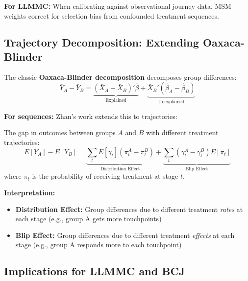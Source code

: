 \textbf{For LLMMC:} When calibrating against observational journey data, MSM weights
correct for selection bias from confounded treatment sequences.

\subsection{Trajectory Decomposition: Extending Oaxaca-Blinder}

The classic \textbf{Oaxaca-Blinder decomposition} \citep{PAP-oaxaca1973decomposition}
decomposes group differences:
\[
\bar{Y}_A - \bar{Y}_B = \underbrace{(\bar{X}_A - \bar{X}_B)'\hat{\beta}}_{\text{Explained}} + \underbrace{\bar{X}_B'(\hat{\beta}_A - \hat{\beta}_B)}_{\text{Unexplained}}
\]

\textbf{For sequences:} Zhan's work extends this to trajectories:

\begin{tcolorbox}[colback=green!5!white, colframe=green!75!black,
    title=Trajectory Gap Decomposition]
The gap in outcomes between groups $A$ and $B$ with different treatment trajectories:
\[
E[Y_A] - E[Y_B] = \underbrace{\sum_t E[\gamma_t](\pi_t^A - \pi_t^B)}_{\text{Distribution Effect}} + \underbrace{\sum_t (\gamma_t^A - \gamma_t^B)E[\pi_t]}_{\text{Blip Effect}}
\]
where $\pi_t$ is the probability of receiving treatment at stage $t$.

\textbf{Interpretation:}
\begin{itemize}[nosep]
\item \textbf{Distribution Effect:} Group differences due to different treatment \emph{rates}
at each stage (e.g., group A gets more touchpoints)
\item \textbf{Blip Effect:} Group differences due to different treatment \emph{effects}
at each stage (e.g., group A responds more to each touchpoint)
\end{itemize}
\end{tcolorbox}

\subsection{Implications for LLMMC and BCJ}


